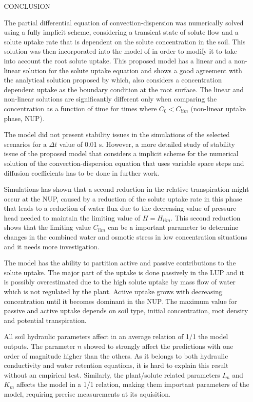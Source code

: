 \cleardoublepage
\chap CONCLUSION

The partial differential equation of convection-dispersion was numerically solved using a fully implicit scheme, considering a transient state of solute flow and a solute uptake rate that is dependent on the solute concentration in the soil.
This solution was then incorporated into the model of \citeonline[liersolute] in order to modify it to take into account the root solute uptake.
This proposed model has a linear and a non-linear solution for the solute uptake equation and shows a good agreement with the analytical solution proposed by \citeonline[cushman] which, also considers a concentration dependent uptake as the boundary condition at the root surface.
The linear and non-linear solutions are significantly different only when comparing the concentration as a function of time for times where $C_0 < C_{lim}$ (non-linear uptake phase, NUP).

{\tblue The model did not present stability issues in the simulations of the selected scenarios for a $\Delta t$ value of 0.01 s.
However, a more detailed study of stability issue of the proposed model that considers a implicit scheme for the numerical solution of the convection-dispersion equation that uses variable space steps and diffusion coefficients has to be done in further work.
}

Simulations has shown that a second reduction in the relative transpiration might occur at the NUP, caused by a reduction of the solute uptake rate in this phase that leads to a reduction of water flux due to the decreasing value of pressure head needed to maintain the limiting value of $H=H_{lim}$.
This second reduction shows that the limiting value $C_{lim}$ can be a important parameter to determine changes in the combined water and osmotic stress in low concentration situations and it needs more investigation.

The model has the ability to partition active and passive contributions to the solute uptake.
The major part of the uptake is done passively  in the LUP and it is possibly overestimated due to the high solute uptake by mass flow of water which is not regulated by the plant. 
Active uptake grows with decreasing concentration until it becomes dominant in the NUP.
The maximum value for passive and active uptake depends on soil type, initial concentration, root density and potential transpiration.

All soil hydraulic parameters affect in an average relation of 1/1 the model outputs.
The parameter $n$ showed to strongly affect the predictions with one order of magnitude higher than the others.
As it belongs to both hydraulic conductivity and water retention equations, it is hard to explain this result without an empirical test.
Similarly, the plant/solute related parameters $I_m$ and $K_m$ affects the model in a 1/1 relation, making them important parameters of the model, requiring precise measurements at its aquisition.

